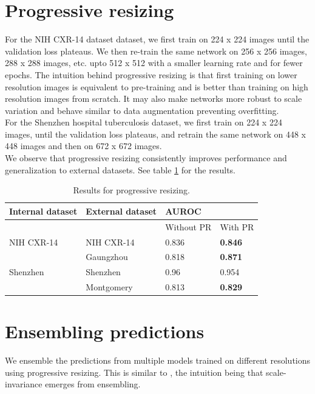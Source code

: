 \documentclass[12pt,oneside,a4paper]{report}
\begin{document}
\section{Progressive resizing\label{progressive_resizing}}
For the NIH CXR-14 dataset dataset, we first train on 224 x 224 images until the
validation loss plateaus. We then re-train the same network on 256 x 256 images,
288 x 288 images, etc. upto 512 x 512 with a smaller learning rate and for
fewer epochs. The intuition behind progressive resizing is that first training
on lower resolution images is equivalent to pre-training and is better than
training on high resolution images from scratch. It may also make networks more
robust to scale variation and behave similar to
data augmentation preventing overfitting.\\

For the Shenzhen hospital tuberculosis dataset, we first train on 224 x 224
images, until the validation loss plateaus, and retrain the same network on 448
x 448 images and then on 672 x 672 images.\\

We observe that progressive resizing consistently improves performance and
generalization to external datasets. See table \ref{tab:progressive_resizing}
for the results.
\begin{table}[]
  \centering
  \begin{tabular}{llll}
    \hline
    \textbf{Internal dataset} & \textbf{External dataset} & \multicolumn{2}{l}{\textbf{AUROC}} \\ \hline
                              &                           & Without PR     & With PR           \\ \hline
    NIH CXR-14                & NIH CXR-14                & 0.836          & \textbf{0.846}    \\ \hline
                              & Gaungzhou                 & 0.818          & \textbf{0.871}    \\ \hline
    Shenzhen                  & Shenzhen                  & 0.96            & 0.954             \\ \hline
                              & Montgomery                & 0.813          & \textbf{0.829}    \\ \hline
  \end{tabular}
  \caption{Results for progressive resizing.}
  \label{tab:progressive_resizing}
\end{table}
\section{Ensembling predictions}
We ensemble the predictions from multiple models trained on different
resolutions using progressive resizing. This is similar to \cite{VanNoord2017},
the intuition being that scale-invariance emerges from ensembling.\\
\end{document}
